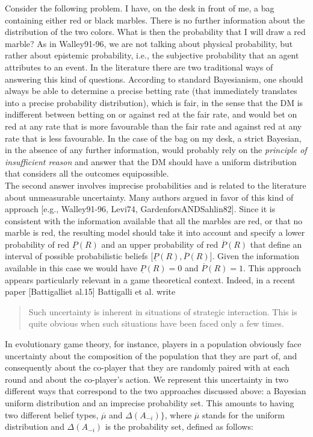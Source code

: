 \documentclass[fleqn,reqno,11pt]{article}
\begin{document}
Consider the following problem. I have, on the desk in front of me, a bag containing either red or black marbles. There is no further information about the distribution of the two colors. What is then the probability that I will draw a red marble? As in Walley91-96, we are not talking about physical probability, but rather about epistemic probability, i.e., the subjective probability that an agent attributes to an event.
In the literature there are two traditional ways of answering this kind of questions. According to standard Bayesianism, one should always be able to determine a precise betting rate (that immediately translates into a precise probability distribution), which is fair, in the sense that the DM is indifferent between betting on or against red at the fair rate, and would bet on red at any rate that is more favourable than the fair rate and against red at any rate that is less favourable. In the case of the bag on my desk, a strict Bayesian, in the absence of any further information, would probably rely on the \textit{principle of insufficient reason} and answer that the DM should have a uniform distribution that considers all the outcomes equipossible. \\
The second answer involves imprecise probabilities and is related to the literature about unmeasurable uncertainty. Many authors argued in favor of this kind of approach [e.g., Walley91-96, Levi74, GardenforsANDSahlin82]. Since it is consistent with the information available that all the marbles are red, or that no marble is red, the resulting model should take it into account and specify a lower probability of red $\underline{P}(R)$ and an upper probability of red $\overline{P}(R)$ that define an interval of possible probabilistic beliefs [$\underline{P}(R), \overline{P}(R)$]. Given the information available in this case we would have $\underline{P}(R)=0$ and $\overline{P}(R)=1$. This approach appears particularly relevant in a game theoretical context. Indeed, in a recent paper [Battigalliet al.15] Battigalli et al. write

\begin{quote}
Such uncertainty is inherent in situations of strategic interaction. This is quite obvious when such situations have been faced only a few times.
\end{quote}

In evolutionary game theory, for instance, players in a population obviously face uncertainty about the composition of the population that they are part of, and consequently about the co-player that they are randomly paired with at each round and about the co-player's action. We represent this uncertainty in two different ways that correspond to the two approaches discussed above: a Bayesian uniform distribution and an imprecise probability set. This amounts to having two different belief types, $ \overline{\mu}$ and $ \Delta(A_{-i}) \rbrace $, where $\overline{\mu}$ stands for the uniform distribution and $\Delta(A_{-i})$ is the probability set, defined as follows:
\end{document}
